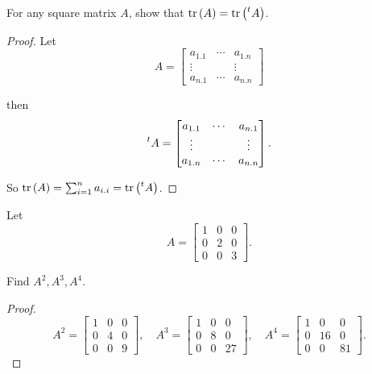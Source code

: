 \begin{exercise}
    For any square matrix $A$, show that $\text{tr}\left({A}\right) = \text{tr}\left({\prescript{t}{}{A}}\right)$.
\end{exercise}

\begin{proof}
    Let
    \[
        A = \begin{bmatrix}
            a_{1.1} & \cdots & a_{1.n} \\
            \vdots  &        & \vdots  \\
            a_{n.1} & \cdots & a_{n.n}
        \end{bmatrix}
    \]

    then
    \[
        \prescript{t}{}{A} = \begin{bmatrix}
            a_{1.1} & \cdots & a_{n.1} \\
            \vdots  &        & \vdots  \\
            a_{1.n} & \cdots & a_{n.n}
        \end{bmatrix}.
    \]

    So $\text{tr}\left({A}\right) = \sum^{n}_{i=1} a_{i.i} = \text{tr}\left({\prescript{t}{}{A}}\right)$.
\end{proof}

\begin{exercise}
    Let
    \[
        A = \begin{bmatrix}
            1 & 0 & 0 \\
            0 & 2 & 0 \\
            0 & 0 & 3
        \end{bmatrix}.
    \]

    Find $A^{2}, A^{3}, A^{4}$.
\end{exercise}

\begin{proof}
    \[
        A^{2} = \begin{bmatrix}
            1 & 0 & 0 \\
            0 & 4 & 0 \\
            0 & 0 & 9
        \end{bmatrix},\quad
        A^{3} = \begin{bmatrix}
            1 & 0 & 0  \\
            0 & 8 & 0  \\
            0 & 0 & 27
        \end{bmatrix},\quad
        A^{4} = \begin{bmatrix}
            1 & 0  & 0  \\
            0 & 16 & 0  \\
            0 & 0  & 81
        \end{bmatrix}.
    \]
\end{proof}

